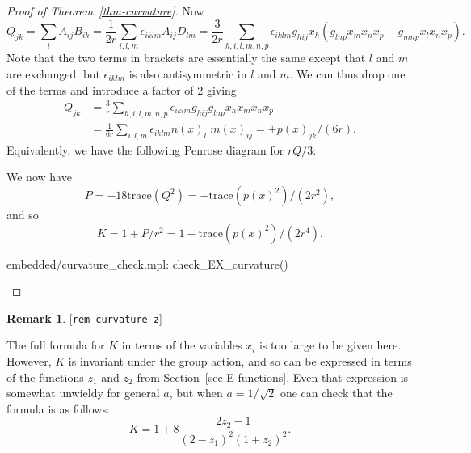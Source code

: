 \documentclass[reqno]{amsart}
\newcommand{\lbl}[1]{\label{#1}\textup{[\texttt{#1}]}\par}
\newcommand{\lbl}{\label}
\newcommand{\ep}        {\epsilon}
\newcommand{\rt}        {\sqrt{2}}
\renewcommand{\:}{\colon}
\theoremstyle{definition}
\newtheorem{remark}[theorem]{Remark}
\begin{document}
\begin{proof}[Proof of Theorem~\ref{thm-curvature}]
 Now
 \[ Q_{jk} = \sum_iA_{ij}B_{ik}
     = \frac{1}{2r}\sum_{i,l,m} \ep_{iklm}A_{ij}D_{lm}
     = \frac{3}{2r}\sum_{h,i,l,m,n,p}
        \ep_{iklm} g_{hij}x_h(g_{lnp}x_mx_nx_p-g_{mnp}x_lx_nx_p).
 \]
 Note that the two terms in brackets are essentially the same except
 that $l$ and $m$ are exchanged, but $\ep_{iklm}$ is also antisymmetric
 in $l$ and $m$.  We can thus drop one of the terms and introduce a
 factor of $2$ giving
 \begin{align*}
  Q_{jk}
   &= \frac{3}{r}\sum_{h,i,l,m,n,p}
       \ep_{iklm} g_{hij}g_{lnp}x_hx_mx_nx_p \\
   &= \frac{1}{6r}\sum_{i,l,m}\ep_{iklm}n(x)_l\;m(x)_{ij}
    = \pm p(x)_{jk}/(6r).
 \end{align*}
 Equivalently, we have the following Penrose diagram for $rQ/3$:
 \begin{center}
 \end{center}
 We now have
 \[ P=-18\text{trace}(Q^2)=-\text{trace}(p(x)^2)/(2r^2), \]
 and so
 \[ K = 1+P/r^2 = 1 - \text{trace}(p(x)^2)/(2r^4). \]
 \begin{checks}
  embedded/curvature_check.mpl: check_EX_curvature()
 \end{checks}
\end{proof}

\begin{remark}\lbl{rem-curvature-z}
 The full formula for $K$ in terms of the variables $x_i$ is too large
 to be given here.  However, $K$ is invariant under the group action,
 and so can be expressed in terms of the functions $z_1$ and $z_2$
 from Section~\ref{sec-E-functions}.  Even that expression is somewhat
 unwieldy for general $a$, but when $a=1/\rt$ one can check that
 the formula is as follows:
 \[ K = 1+ 8 \frac{2z_2-1}{(2-z_1)^2(1+z_2)^2}. \]
\end{remark}
\end{document}

